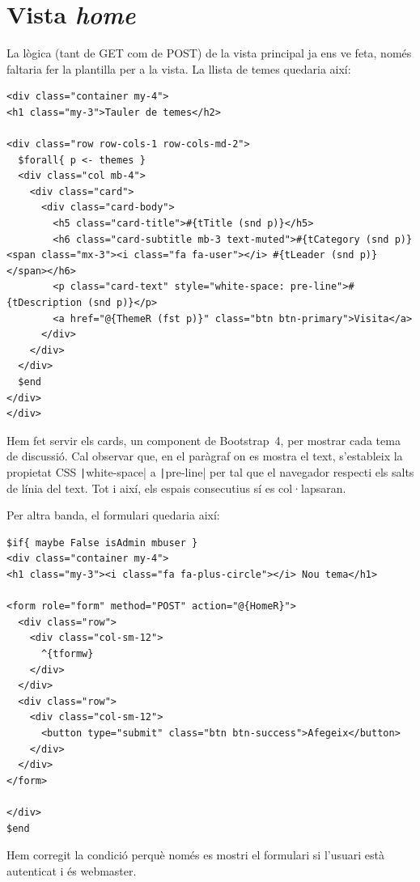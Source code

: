 \documentclass[catalan, a4paper]{scrartcl}
\begin{document}
\clearpage
\section{Vista \emph{home}}

La lògica (tant de \textsf{GET} com de \textsf{POST}) de la vista principal
ja ens ve feta, només faltaria fer la plantilla per a la vista. La llista
de temes quedaria així:

\begin{verbatim}
<div class="container my-4">
<h1 class="my-3">Tauler de temes</h2>

<div class="row row-cols-1 row-cols-md-2">
  $forall{ p <- themes }
  <div class="col mb-4">
    <div class="card">
      <div class="card-body">
        <h5 class="card-title">#{tTitle (snd p)}</h5>
        <h6 class="card-subtitle mb-3 text-muted">#{tCategory (snd p)} <span class="mx-3"><i class="fa fa-user"></i> #{tLeader (snd p)}</span></h6>
        <p class="card-text" style="white-space: pre-line">#{tDescription (snd p)}</p>
        <a href="@{ThemeR (fst p)}" class="btn btn-primary">Visita</a>
      </div>
    </div>
  </div>
  $end
</div>
</div>
\end{verbatim}

Hem fet servir els cards, un component de Bootstrap~4, per mostrar cada
tema de discussió. Cal observar que, en el paràgraf on es mostra el text, s'estableix la propietat
CSS \texttt|white-space| a \texttt|pre-line| per tal que el
navegador respecti els salts de línia del text. Tot i així, els espais consecutius
sí es col·lapsaran.

Per altra banda, el formulari quedaria així:

\begin{verbatim}
$if{ maybe False isAdmin mbuser }
<div class="container my-4">
<h1 class="my-3"><i class="fa fa-plus-circle"></i> Nou tema</h1>

<form role="form" method="POST" action="@{HomeR}">
  <div class="row">
    <div class="col-sm-12">
      ^{tformw}
    </div>
  </div>
  <div class="row">
    <div class="col-sm-12">
      <button type="submit" class="btn btn-success">Afegeix</button>
    </div>
  </div>
</form>

</div>
$end    
\end{verbatim}

Hem corregit la condició perquè només es mostri el formulari si l'usuari
està autenticat i és webmaster.
\end{document}
